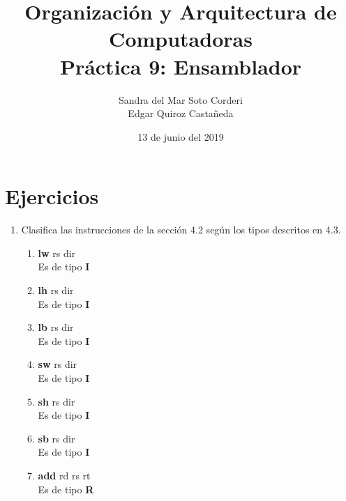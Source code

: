 \documentclass{article}
\begin{document}
    \title{
        Organización y Arquitectura de Computadoras \\
        Práctica 9: Ensamblador \\
    }
    \date{
        13 de junio del 2019
    }
    \author{
        Sandra del Mar Soto Corderi \\
        Edgar Quiroz Castañeda
    }
    \maketitle
	\section{Ejercicios}
	\begin{enumerate}

		\item {
			Clasifica las instrucciones de la sección 4.2 según los tipos descritos en 4.3.

			\begin{enumerate}
				\item{ \textbf{lw} rs dir\\
					Es de tipo \textbf{I}  \\
				}

        		\item{ \textbf{lh} rs dir\\
        			Es de tipo \textbf{I}  \\
				}

				\item{ \textbf{lb} rs dir\\
					Es de tipo \textbf{I}  \\
				}

				\item{ \textbf{sw} rs dir\\
					Es de tipo \textbf{I}  \\
			  	}

				\item{ \textbf{sh} rs dir\\
					Es de tipo \textbf{I}\\
				}

				\item{ \textbf{sb} rs dir\\
					Es de tipo \textbf{I} \\
				}

				\item{ \textbf{add} rd rs rt\\
					Es de tipo \textbf{R}\\
				}


\end{enumerate}}
\end{enumerate}
\end{document}
